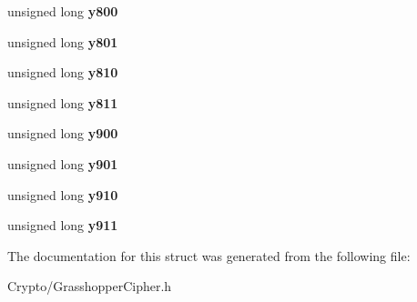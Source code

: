 \begin{DoxyCompactItemize}
unsigned long {\bfseries y800}
\item 
\mbox{\label{structgrasshopper__kds_ad51cb83fb71f71a999b0ac9fb2b58095}} 
unsigned long {\bfseries y801}
\item 
\mbox{\label{structgrasshopper__kds_acab85bcd721959399938c2ad06635ed5}} 
unsigned long {\bfseries y810}
\item 
\mbox{\label{structgrasshopper__kds_aea8f9c397d8da03bff12af263c7efff2}} 
unsigned long {\bfseries y811}
\item 
\mbox{\label{structgrasshopper__kds_a1a44d1579bc74042cb57a367d906f79c}} 
unsigned long {\bfseries y900}
\item 
\mbox{\label{structgrasshopper__kds_a9bcf427edabd7c3ad229b33abbbe913e}} 
unsigned long {\bfseries y901}
\item 
\mbox{\label{structgrasshopper__kds_ae6634b3692f4360d2352998c476d1077}} 
unsigned long {\bfseries y910}
\item 
\mbox{\label{structgrasshopper__kds_afd72558fbce9300201742f065f547b60}} 
unsigned long {\bfseries y911}
\end{DoxyCompactItemize}


The documentation for this struct was generated from the following file\+:\begin{DoxyCompactItemize}
\item 
Crypto/Grasshopper\+Cipher.\+h\end{DoxyCompactItemize}
